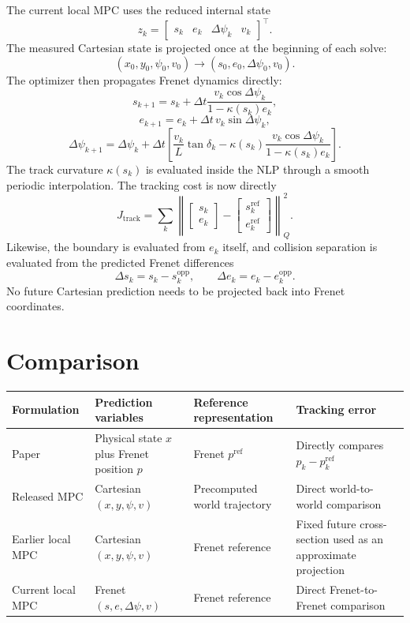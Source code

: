 \documentclass[11pt]{article}
\begin{document}
The current local MPC uses the reduced internal state
\[
  z_k=
  \begin{bmatrix}
    s_k&e_k&\Delta\psi_k&v_k
  \end{bmatrix}^{\top}.
\]
The measured Cartesian state is projected once at the beginning of each solve:
\[
  (x_0,y_0,\psi_0,v_0)
  \longrightarrow
  (s_0,e_0,\Delta\psi_0,v_0).
\]
The optimizer then propagates Frenet dynamics directly:
\[
  s_{k+1}
  =s_k+\Delta t
  \frac{v_k\cos\Delta\psi_k}{1-\kappa(s_k)e_k},
\]
\[
  e_{k+1}
  =e_k+\Delta t\,v_k\sin\Delta\psi_k,
\]
\[
  \Delta\psi_{k+1}
  =\Delta\psi_k+\Delta t
  \left[
    \frac{v_k}{L}\tan\delta_k
    -\kappa(s_k)
     \frac{v_k\cos\Delta\psi_k}{1-\kappa(s_k)e_k}
  \right].
\]
The track curvature $\kappa(s_k)$ is evaluated inside the NLP through a smooth
periodic interpolation. The tracking cost is now directly
\[
  J_{\mathrm{track}}
  =\sum_k
  \left\|
    \begin{bmatrix}s_k\\e_k\end{bmatrix}
    -
    \begin{bmatrix}s_k^{\mathrm{ref}}\\e_k^{\mathrm{ref}}\end{bmatrix}
  \right\|_Q^2.
\]
Likewise, the boundary is evaluated from $e_k$ itself, and collision separation
is evaluated from the predicted Frenet differences
\[
  \Delta s_k=s_k-s_k^{\mathrm{opp}},
  \qquad
  \Delta e_k=e_k-e_k^{\mathrm{opp}}.
\]
No future Cartesian prediction needs to be projected back into Frenet
coordinates.

\section{Comparison}

\begin{center}
\small
\renewcommand{\arraystretch}{1.25}
\begin{tabular}{>{\raggedright\arraybackslash}p{}
                >{\raggedright\arraybackslash}p{}
                >{\raggedright\arraybackslash}p{}
                >{\raggedright\arraybackslash}p{}}
\toprule
Formulation & Prediction variables & Reference representation & Tracking error \\
\midrule
Paper & Physical state $x$ plus Frenet position $p$ & Frenet $p^{\mathrm{ref}}$ & Directly compares $p_k-p_k^{\mathrm{ref}}$ \\
Released MPC & Cartesian $(x,y,\psi,v)$ & Precomputed world trajectory & Direct world-to-world comparison \\
Earlier local MPC & Cartesian $(x,y,\psi,v)$ & Frenet reference & Fixed future cross-section used as an approximate projection \\
Current local MPC & Frenet $(s,e,\Delta\psi,v)$ & Frenet reference & Direct Frenet-to-Frenet comparison \\
\bottomrule
\end{tabular}
\end{center}
\end{document}

